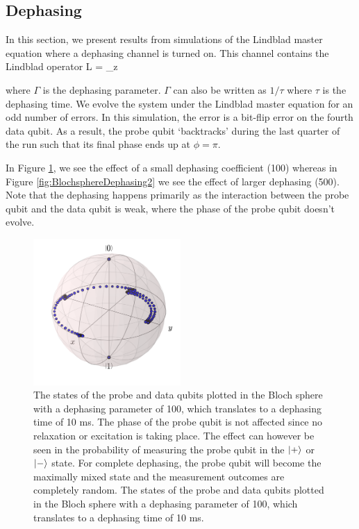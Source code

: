 \documentclass[%
 reprint,
 amsmath,amssymb,
 aps,
]{revtex4-1}
\begin{document}
\subsection{Dephasing}
In this section, we present results from simulations of the Lindblad master equation where a dephasing channel is turned on. This channel contains the Lindblad operator
\beq
L  = \sqrt{\Gamma} \sigma_z
\eeq

where $\Gamma$ is the dephasing parameter. $\Gamma$ can also be written as $1/\tau$ where $\tau$ is the dephasing time. We evolve the system under the Lindblad master equation for an odd number of errors. In this simulation, the error is a bit-flip error on the fourth data qubit.  As a result, the probe qubit `backtracks'  during the last quarter of the run such that its final phase ends up at $\phi = \pi$. 

In Figure \ref{fig:BlochsphereDephasing}, we see the effect of a small dephasing coefficient (100) whereas in Figure \ref{fig:BlochsphereDephasing2} we see the effect of larger dephasing (500). Note that the dephasing happens primarily as the interaction between the probe qubit and the data qubit is weak, where the phase of the probe qubit doesn't evolve. 



\begin{figure}[h]
  \centering
    \includegraphics[width=0.5\textwidth]{Figures/Circ_orbit_odd_100_dephasing.png}
      \caption{The states of the probe and data qubits plotted in the Bloch sphere with a dephasing parameter of 100, which translates to a dephasing time of 10 ms. The phase of the probe qubit is not affected since no relaxation or excitation is taking place. The effect can however be seen in the probability of measuring the probe qubit in the $\ket{+}$ or $\ket{-}$ state. For complete dephasing, the probe qubit will become the maximally mixed state and the measurement outcomes are completely random. The states of the probe and data qubits plotted in the Bloch sphere with a dephasing parameter of 100, which translates to a dephasing time of 10 ms.}
      \label{fig:BlochsphereDephasing}
      
\end{figure}
\end{document}
